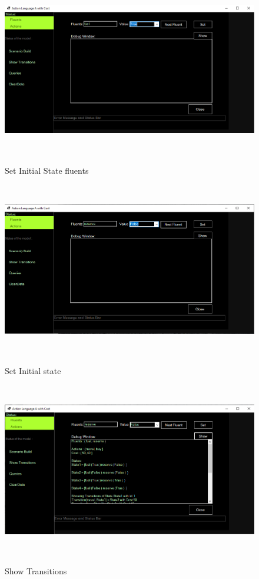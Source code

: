 \documentclass[11pt]{article}
\begin{document}
	\begin{figure}[H]
		\centering
		\includegraphics[width=6in,height=3in]{./testImages/Example1/img3.png}
		\label{Figure:f01.3}
		\caption{Set Initial State fluents}
	\end{figure}
	\begin{figure}[H]
		\centering
		\includegraphics[width=6in,height=3in]{./testImages/Example1/img4.png}
		\label{Figure:f01.4}
		\caption{Set Initial state}
	\end{figure}
	\begin{figure}[H]
		\centering
		\includegraphics[width=6in,height=3in]{./testImages/Example1/img5.png}
		\label{Figure:f01.5}
		\caption{Show Transitions}
	\end{figure}
\end{document}
